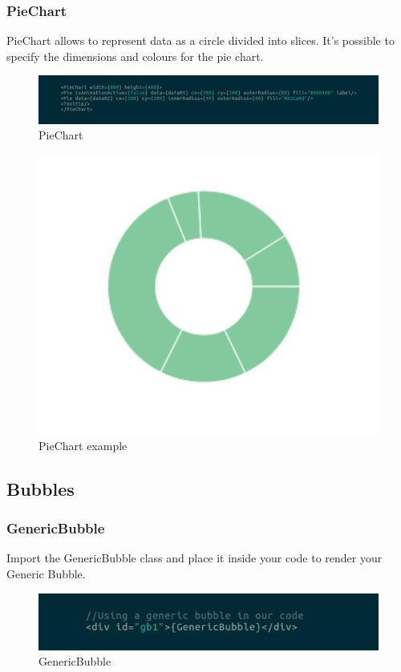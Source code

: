 \subsubsection{PieChart}
PieChart allows to represent data as a circle divided into slices. It's possible to specify the dimensions and colours for the pie chart. 
\begin{figure}[H]
	\centering
	\includegraphics[width=14cm]{../../documenti/UserManualFramework/framework_view/19framework_view_pie.png}
	\caption{PieChart}
\end{figure}
\begin{figure}[H]
	\centering
	\includegraphics[width=14cm]{../../documenti/UserManualFramework/framework_view/piechart.png}
	\caption{PieChart example}
\end{figure}

\subsection{Bubbles}
\subsubsection{GenericBubble}
Import the GenericBubble class and place it inside your code to render your Generic Bubble. 
\begin{figure}[H]
	\centering
	\includegraphics[width=14cm]{../../documenti/UserManualFramework/framework_view/20framework_view_generic.png}
	\caption{GenericBubble}
\end{figure}

